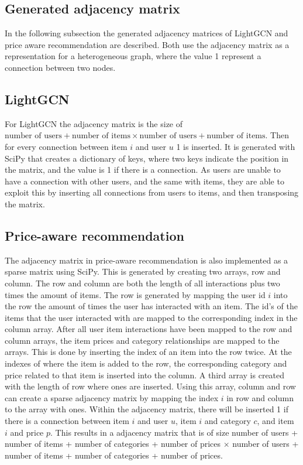 \subsection{Generated adjacency matrix}
In the following subsection the generated adjacency matrices of LightGCN and price aware recommendation are described.
Both use the adjacency matrix as a representation for a heterogeneous graph, where the value 1 represent a connection between two nodes.

\subsection{LightGCN}
For LightGCN the adjacency matrix is the size of $\textrm{number of users} + \textrm{number of items} \times \textrm{number of users} + \textrm{number of items}$.
Then for every connection between item $i$ and user $u$ 1 is inserted.
It is generated with SciPy that creates a dictionary of keys, where two keys indicate the position in the matrix, and the value is 1 if there is a connection. 
As users are unable to have a connection with other users, and the same with items, they are able to exploit this by inserting all connections from users to items, and then transposing the matrix.

\subsection{Price-aware recommendation}
The adjacency matrix in price-aware recommendation is also implemented as a sparse matrix using SciPy.
This is generated by creating two arrays, row and column.
The row and column are both the length of all interactions plus two times the amount of items.
The row is generated by mapping the user id $i$ into the row the amount of times the user has interacted with an item.
The id's of the items that the user interacted with are mapped to the corresponding index in the column array.
After all user item interactions have been mapped to the row and column arrays, the item prices and category relationships are mapped to the arrays.
This is done by inserting the index of an item into the row twice.
At the indexes of where the item is added to the row, the corresponding category and price related to that item is inserted into the column.
A third array is created with the length of row where ones are inserted.
Using this array, column and row can create a sparse adjacency matrix by mapping the index $i$ in row and column to the array with ones.
Within the adjacency matrix, there will be inserted 1 if there is a connection between item $i$ and user $u$, item $i$ and category $c$, and item $i$ and price $p$.
This results in a adjacency matrix that is of size number of users + number of items + number of categories + number of prices $\times$ number of users + number of items + number of categories + number of prices.
